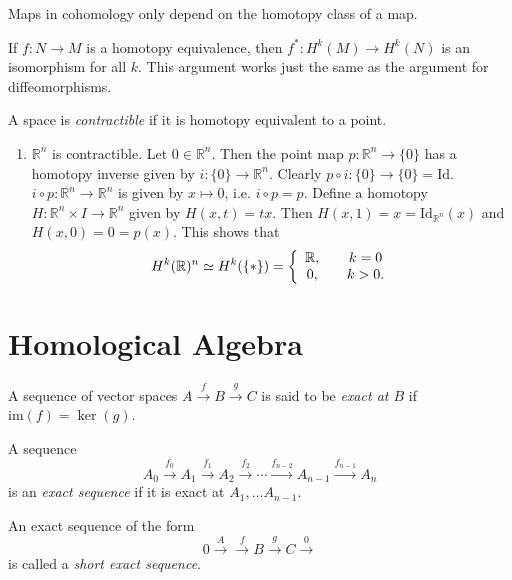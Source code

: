\begin{enumerate}
{    \begin{theorem}
      Maps in cohomology only depend on the homotopy class of a map.
    \end{theorem}

    \begin{corol}
      If $f: N \to M$ is a homotopy equivalence, then
      $f^\ast : H^k(M) \to H^k(N)$ is an isomorphism for all $k$. This
      argument works just the same as the argument for diffeomorphisms.
    \end{corol}
  }
\end{enumerate}

\begin{defn}
  A space is \emph{contractible} if it is homotopy equivalent to a point.
\end{defn}

\begin{xmpl}
  \begin{enumerate}
    \item{
      $\mathbb{R}^n$ is contractible. Let $0 \in \mathbb{R}^n$. Then
      the point map $p : \mathbb{R}^n \to \{ 0 \}$ has a homotopy
      inverse given by $i: \{0\} \to \mathbb{R}^n$. Clearly
      $p \circ i : \{0\} \to \{0\} = \mathrm{Id}$.
      $i \circ p : \mathbb{R}^n \to \mathbb{R}^n$ is given by
      $x \mapsto 0$, i.e. $i \circ p = p$. Define a homotopy
      $H: \mathbb{R}^n \times I \to \mathbb{R}^n$ given by
      $H(x, t) = t x$. Then $H(x,1) = x =
      \mathrm{Id}_{\mathbb{R}^n}(x)$ and $H(x, 0) = 0 = p(x)$.
      This shows that
      $$
             H^k(\mathbb{R})^n
      \simeq H^k(\{\ast\})
      =      \left\{
               \begin{array}{c c}
                 \mathbb{R}, & \quad k = 0 \\
                 0,          & \quad k > 0.
               \end{array}
             \right.
     $$
     }
  \end{enumerate}
\end{xmpl}

\section{Homological Algebra}

\begin{defn}
A sequence of vector spaces
$A \xrightarrow{f} B \xrightarrow{g} C$ is said to be
\emph{exact at $B$} if $\mathrm{im}(f) = \ker(g)$.

A sequence
$$
  A_0    \xrightarrow{f_0}
  A_1    \xrightarrow{f_1}
  A_2    \xrightarrow{f_2}
  \cdots \xrightarrow{f_{n-2}}
  A_{n-1} \xrightarrow{f_{n-1}}
  A_n
$$
is an \emph{exact sequence} if it is exact at
$A_1, \dots A_{n-1}$.

An exact sequence of the form
$$
0 \xrightarrow
A \xrightarrow{f}
B \xrightarrow{g}
C \xrightarrow
0
$$
is called a \emph{short exact sequence}.
\end{defn}

